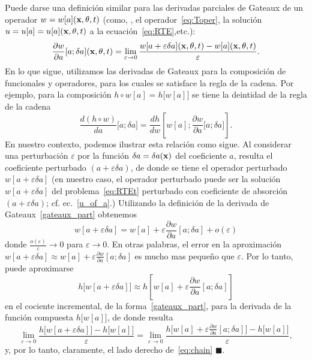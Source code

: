 Puede darse una definición similar para las derivadas parciales de Gateaux 
de un operador $w = w[a](\mathbf{x},\theta,t)$ (como, \eg, el operador~\eqref{eq:Toper}, 
la solución $u = u[a]=u[a](\mathbf{x},\theta,t)$ a la ecuación~\eqref{eq:RTE},etc.):
\begin{equation}\label{gateaux_part}
  \frac{\partial w}{\partial a}[a; \delta a ](\mathbf{x},\theta,t) = \lim_{\varepsilon \to 0} \frac{w[a +\varepsilon \delta a](\mathbf{x},\theta,t)
    - w[a](\mathbf{x},\theta,t)}{\varepsilon}.
\end{equation}
En lo que sigue, utilizamos las derivadas de Gateaux para la composición 
de funcionales y operadores, para los cuales se satisface la regla de la cadena. 
Por ejemplo, para la composición  $h\circ w [a] = h\big[w[a]\big]$ 
se tiene la deintidad de la regla de la cadena
\begin{equation}\label{eq:chain}
  \frac{d (h\circ w)}{da} \big[a;\delta a\big]= \frac{d h}{
    d w}\left[w[a];\frac{\partial w}{\partial a} \big[a;\delta
    a\big]\right].
\end{equation}
En nuestro contexto, podemos ilustrar esta relación como sigue. 
Al considerar una perturbación $\varepsilon$ por la función $\delta a = \delta a(\mathbf{x})$ 
del coeficiente $a$, resulta el coeficiente perturbado $(a+\varepsilon\delta a)$, 
de donde se tiene el operador perturbado $w[a+\varepsilon\delta a]$ (en nuestro caso, 
el operador perturbado puede ser \eg la solución $w[a+\varepsilon\delta a]$ del problema~\eqref{eq:RTEt} perturbado con coeficiente de absorción $(a+\varepsilon\delta a)$; 
cf. ec.~\eqref{u_of_a}.) Utilizando la definición de la derivada 
de Gateaux~\eqref{gateaux_part} obtenemos
\[
  w[a+\varepsilon\delta a] = w[a]+\varepsilon \frac{\partial
    w}{\partial a}[a; \delta a ] + o(\varepsilon)
\]
donde $\frac{o(\varepsilon)}{\varepsilon}\to 0$ para $\varepsilon\to 0$. 
En otras palabras, el error en la aproximación $w[a+\varepsilon\delta a] \approx w[a]+\varepsilon \frac{\partial
  w}{\partial a}[a; \delta a ]$ es mucho mas pequeño que $\varepsilon$. 
Por lo tanto, puede aproximarse   
\[
  h\big[w[a+\varepsilon\delta a]\big] \approx h\left[w[a]+\varepsilon \frac{\partial
    w}{\partial a}[a; \delta a ]\right]
\]
en el cociente incremental, de la forma~\eqref{gateaux_part}, 
para la derivada de la función compuesta $h\big[w[a]\big]$, 
de donde resulta 
\[
 \lim_{\varepsilon\to 0}\frac{h\big[w[a+\varepsilon\delta a]\big]
     -h\big[w[a]\big]}{\varepsilon}  = \lim_{\varepsilon\to
    0} \frac{h\big[w[a]+\varepsilon \frac{\partial w}{\partial a}[a;
    \delta a ]\big]-h\big[w[a]\big]}{\varepsilon},
\]
y, por lo tanto, claramente, el lado derecho de~\eqref{eq:chain} $\blacksquare$.

